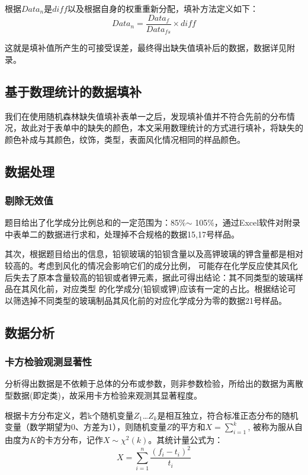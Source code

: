 \documentclass[UTF8]{ctexart}
\begin{document}
            根据$Data_n$是$diff$以及根据自身的权重重新分配，填补方法定义如下：
            \begin{equation}
                Data_n=\frac{Data_f}{Data_{fs}}\times diff
            \end{equation}

            这就是填补值所产生的可接受误差，最终得出缺失值填补后的数据，数据详见附录。


            \subsection{基于数理统计的数据填补}
            我们在使用随机森林缺失值填补表单一之后，发现填补值并不符合先前的分布情况，故此对于表单中的缺失的颜色，本文采用数理统计的方式进行填补，将缺失的颜色补成与其颜色，纹饰，类型，表面风化情况相同的样品颜色。


            \subsection{数据处理}
            \subsubsection{剔除无效值}
            题目给出了化学成分比例总和的一定范围为：85$\%$$ \sim $ 105$\%$，通过Excel软件对附录中表单二的数据进行求和，处理掉不合规格的数据15,17号样品。

                其次，根据题目给出的信息，铅钡玻璃的铅钡含量以及高钾玻璃的钾含量都是相对较高的。考虑到风化的情况会影响它们的成分比例，
                可能存在化学反应使其风化后失去了原本含量较高的铅钡或者钾元素，据此可得出结论：其不同类型的玻璃样品在其风化前，对应类型
                的化学成分(铅钡或钾)应该有一定的占比。根据结论可以筛选掉不同类型的玻璃制品其风化前的对应化学成分为零的数据21号样品。


                \subsection{数据分析}
                \subsubsection{卡方检验观测显著性}
                分析得出数据是不依赖于总体的分布或参数，则非参数检验，所给出的数据为离散型数据(即定类)，故采用卡方检验来观测其显著程度。

                根据卡方分布定义，若k个随机变量$Z_1$\dots $Z_k$是相互独立，符合标准正态分布的随机变量（数学期望为0、方差为1），则随机变量$Z$的平方和$X=\sum_{i=1}^k$,
                被称为服从自由度为$K$的卡方分布，记作$X \sim \chi ^2(k)$。其统计量公式为：
                \begin{equation}
                    X=\sum_{i=1}^n \frac{(f_i-t_i)^2}{t_i}
                \end{equation}
\end{document}
